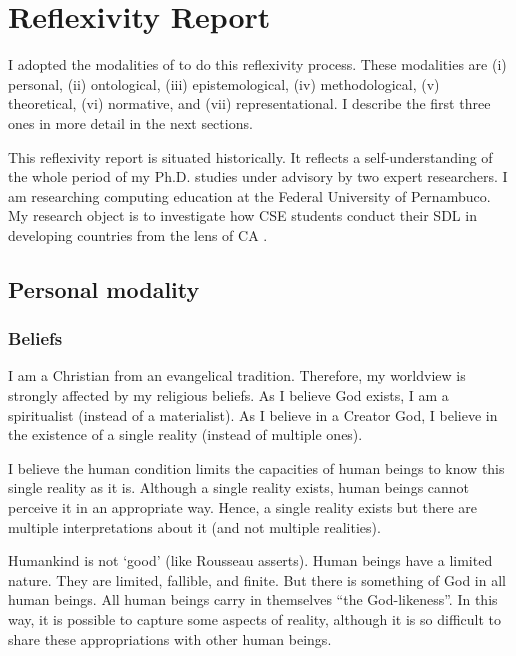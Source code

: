 \section{Reflexivity Report}
\label{reflexivity:report}

I adopted the modalities of  to do this reflexivity process. These modalities are (i) personal, (ii) ontological, (iii) epistemological, (iv) methodological, (v) theoretical, (vi) normative, and (vii) representational. I describe the first three ones in more detail in the next sections.

This reflexivity report is situated historically. It reflects a self-understanding of the whole period of my Ph.D. studies under advisory by two expert researchers. I am researching computing education at the Federal University of Pernambuco. My research object is to investigate how \acrfull{CSE} students conduct their \acrfull{SDL} in developing countries from the lens of \acrfull{CA} \cite{sen:1992,robeyns:2023}.

\subsection{Personal modality}

\subsubsection{Beliefs}
\label{reflex-sss:beliefs}

I am a Christian from an evangelical tradition. Therefore, my worldview is strongly affected by my religious beliefs. As I believe God exists, I am a spiritualist (instead of a materialist). As I believe in a Creator God, I believe in the existence of a single reality (instead of multiple ones). 

I believe the human condition limits the capacities of human beings to know this single reality as it is. Although a single reality exists, human beings cannot perceive it in an appropriate way. Hence, a single reality exists but there are multiple interpretations about it (and not multiple realities). 

Humankind is not ‘good’ (like Rousseau asserts). Human beings have a limited nature. They are limited, fallible, and finite. But there is something of God in all human beings. All human beings carry in themselves “the God-likeness”. In this way, it is possible to capture some aspects of reality, although it is so difficult to share these appropriations with other human beings.

